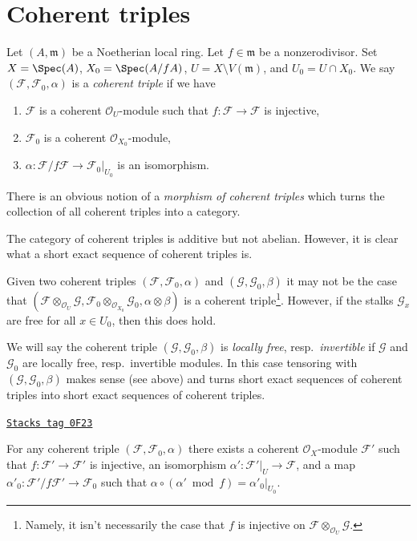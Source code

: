 \section{Coherent triples}
\label{algebraization-section-coherent-triples}
Let $(A, \mathfrak m)$ be a Noetherian local ring.
Let $f \in \mathfrak m$ be a nonzerodivisor. Set
$X = \Spec(A)$, $X_0 = \Spec(A/fA)$, $U = X \setminus V(\mathfrak m)$, and
$U_0 = U \cap X_0$.
We say $(\mathcal{F}, \mathcal{F}_0, \alpha)$ is a {\it coherent triple}
if we have
\begin{enumerate}
\item $\mathcal{F}$ is a coherent $\mathcal{O}_U$-module such that
$f : \mathcal{F} \to \mathcal{F}$ is injective,
\item $\mathcal{F}_0$ is a coherent $\mathcal{O}_{X_0}$-module,
\item $\alpha : \mathcal{F}/f\mathcal{F} \to \mathcal{F}_0|_{U_0}$
is an isomorphism.
\end{enumerate}
There is an obvious notion of a {\it morphism of coherent triples}
which turns the collection of all coherent triples into a category.

\medskip\noindent
The category of coherent triples is additive but not abelian.
However, it is clear what a short exact sequence of coherent
triples is.

\medskip\noindent
Given two coherent triples $(\mathcal{F}, \mathcal{F}_0, \alpha)$
and $(\mathcal{G}, \mathcal{G}_0, \beta)$ it may not be the case that
$(\mathcal{F} \otimes_{\mathcal{O}_U} \mathcal{G},
\mathcal{F}_0  \otimes_{\mathcal{O}_{X_0}} \mathcal{G}_0,
\alpha \otimes \beta)$ is a coherent triple\footnote{Namely, it
isn't necessarily the case that $f$
is injective on $\mathcal{F} \otimes_{\mathcal{O}_U} \mathcal{G}$.}.
However, if the stalks $\mathcal{G}_x$ are
free for all $x \in U_0$, then this does hold.

\medskip\noindent
We will say the coherent triple $(\mathcal{G}, \mathcal{G}_0, \beta)$
is {\it locally free}, resp.\ {\it invertible}
if $\mathcal{G}$ and $\mathcal{G}_0$
are locally free, resp.\ invertible modules. In this case tensoring
with $(\mathcal{G}, \mathcal{G}_0, \beta)$ makes sense (see above)
and turns short exact sequences of coherent triples into short exact
sequences of coherent triples.

\begin{lemma}
\label{algebraization-lemma-prepare-chi-triple}
\href{https://stacks.math.columbia.edu/tag/0F23}{\texttt{Stacks tag 0F23}}

For any coherent triple $(\mathcal{F}, \mathcal{F}_0, \alpha)$
there exists a coherent $\mathcal{O}_X$-module $\mathcal{F}'$
such that $f : \mathcal{F}' \to \mathcal{F}'$ is injective,
an isomorphism $\alpha' : \mathcal{F}'|_U \to \mathcal{F}$, and a map
$\alpha'_0 : \mathcal{F}'/f\mathcal{F}' \to \mathcal{F}_0$
such that $\alpha \circ (\alpha' \bmod f) = \alpha'_0|_{U_0}$.
\end{lemma}

